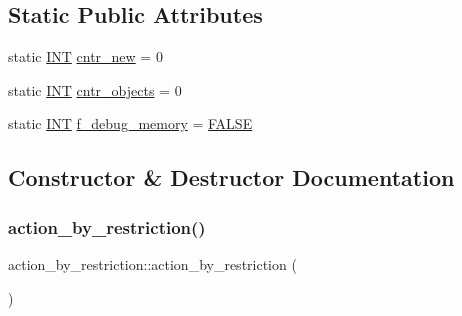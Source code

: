\subsection*{Static Public Attributes}
\begin{DoxyCompactItemize}
\item 
static \mbox{\hyperlink{galois_8h_a09fddde158a3a20bd2dcadb609de11dc}{I\+NT}} \mbox{\hyperlink{classaction__by__restriction_abd482adcfe49d451b0e93591239fc31e}{cntr\+\_\+new}} = 0
\item 
static \mbox{\hyperlink{galois_8h_a09fddde158a3a20bd2dcadb609de11dc}{I\+NT}} \mbox{\hyperlink{classaction__by__restriction_accc24e2294d6f562e0984c7f522ebc4f}{cntr\+\_\+objects}} = 0
\item 
static \mbox{\hyperlink{galois_8h_a09fddde158a3a20bd2dcadb609de11dc}{I\+NT}} \mbox{\hyperlink{classaction__by__restriction_ad797e9d9d4838ba504a91798c1fa0299}{f\+\_\+debug\+\_\+memory}} = \mbox{\hyperlink{nauty_8h_aa93f0eb578d23995850d61f7d61c55c1}{F\+A\+L\+SE}}
\end{DoxyCompactItemize}


\subsection{Constructor \& Destructor Documentation}
\mbox{\label{classaction__by__restriction_a0f00372746ec06fde4350c2e4e20c8c1}} 
\subsubsection{\texorpdfstring{action\+\_\+by\+\_\+restriction()}{action\_by\_restriction()}}
{\footnotesize\ttfamily action\+\_\+by\+\_\+restriction\+::action\+\_\+by\+\_\+restriction (\begin{DoxyParamCaption}{ }\end{DoxyParamCaption})}

\mbox{\label{classaction__by__restriction_a41b6e37425a151b509bffa1f36a96939}} 
